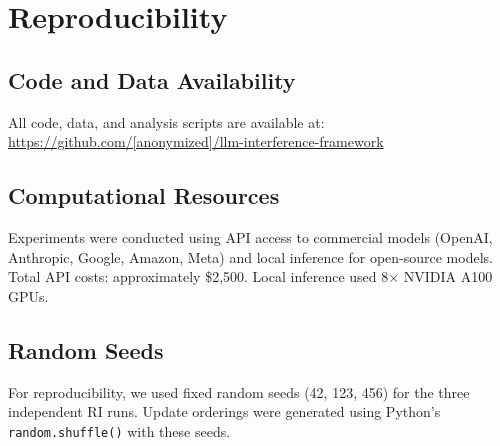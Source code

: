 \documentclass{article}
\begin{document}
\section{Reproducibility}
\label{appendix:reproducibility}

\subsection{Code and Data Availability}

All code, data, and analysis scripts are available at: \url{https://github.com/[anonymized]/llm-interference-framework}

\subsection{Computational Resources}

Experiments were conducted using API access to commercial models (OpenAI, Anthropic, Google, Amazon, Meta) and local inference for open-source models. Total API costs: approximately \$2,500. Local inference used 8$\times$ NVIDIA A100 GPUs.

\subsection{Random Seeds}

For reproducibility, we used fixed random seeds (42, 123, 456) for the three independent RI runs. Update orderings were generated using Python's \texttt{random.shuffle()} with these seeds.



\end{document}
